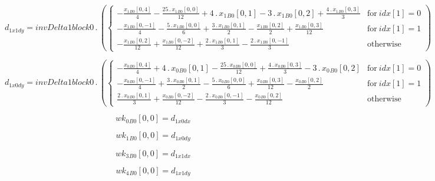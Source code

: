 \documentclass{article}
\begin{document}
\begin{dmath}d_{1 x1 dy} = invDelta1block0 \,.\, \left(\begin{cases} - \frac{{x_{1}{_{B0}}}[{0,4}]}{4} - \frac{25 \,.\, {x_{1}{_{B0}}}[{0,0}]}{12} + 4 \,.\, {x_{1}{_{B0}}}[{0,1}] - 3 \,.\, {x_{1}{_{B0}}}[{0,2}] + \frac{4 \,.\, 
{x_{1}{_{B0}}}[{0,3}]}{3} & \text{for}\: {idx}[{1}] = 0 \\- \frac{{x_{1}{_{B0}}}[{0,-1}]}{4} - \frac{5 \,.\, {x_{1}{_{B0}}}[{0,0}]}{6} + \frac{3 \,.\, {x_{1}{_{B0}}}[{0,1}]}{2} - \frac{{x_{1}{_{B0}}}[{0,2}]}{2} + \frac{{x_{1}{_{B0}}}[{0,3}]}{12} & 
\text{for}\: {idx}[{1}] = 1 \\- \frac{{x_{1}{_{B0}}}[{0,2}]}{12} + \frac{{x_{1}{_{B0}}}[{0,-2}]}{12} + \frac{2 \,.\, {x_{1}{_{B0}}}[{0,1}]}{3} - \frac{2 \,.\, {x_{1}{_{B0}}}[{0,-1}]}{3} & \text{otherwise} \end{cases}\right)\end{dmath}

\begin{dmath}d_{1 x0 dy} = invDelta1block0 \,.\, \left(\begin{cases} - \frac{{x_{0}{_{B0}}}[{0,4}]}{4} + 4 \,.\, {x_{0}{_{B0}}}[{0,1}] - \frac{25 \,.\, {x_{0}{_{B0}}}[{0,0}]}{12} + \frac{4 \,.\, {x_{0}{_{B0}}}[{0,3}]}{3} - 3 \,.\, 
{x_{0}{_{B0}}}[{0,2}] & \text{for}\: {idx}[{1}] = 0 \\- \frac{{x_{0}{_{B0}}}[{0,-1}]}{4} + \frac{3 \,.\, {x_{0}{_{B0}}}[{0,1}]}{2} - \frac{5 \,.\, {x_{0}{_{B0}}}[{0,0}]}{6} + \frac{{x_{0}{_{B0}}}[{0,3}]}{12} - \frac{{x_{0}{_{B0}}}[{0,2}]}{2} & 
\text{for}\: {idx}[{1}] = 1 \\\frac{2 \,.\, {x_{0}{_{B0}}}[{0,1}]}{3} + \frac{{x_{0}{_{B0}}}[{0,-2}]}{12} - \frac{2 \,.\, {x_{0}{_{B0}}}[{0,-1}]}{3} - \frac{{x_{0}{_{B0}}}[{0,2}]}{12} & \text{otherwise} \end{cases}\right)\end{dmath}

\begin{dmath}{wk_{0}{_{B0}}}[{0,0}] = d_{1 x0 dx}\end{dmath}

\begin{dmath}{wk_{1}{_{B0}}}[{0,0}] = d_{1 x0 dy}\end{dmath}

\begin{dmath}{wk_{3}{_{B0}}}[{0,0}] = d_{1 x1 dx}\end{dmath}

\begin{dmath}{wk_{4}{_{B0}}}[{0,0}] = d_{1 x1 dy}\end{dmath}
\end{document}
